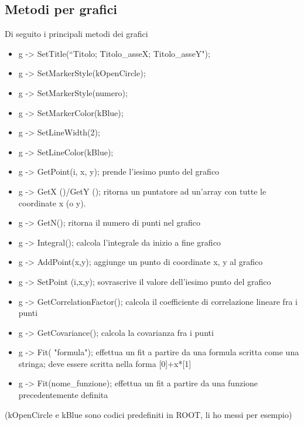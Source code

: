 \documentclass[10pt,a4paper]{article}
\begin{document}
\subsection{Metodi per grafici}
Di seguito i principali metodi dei grafici
\begin{itemize}
	\item g -> SetTitle(“Titolo; Titolo\_asseX; Titolo\_asseY");
	\item g -> SetMarkerStyle(kOpenCircle);
	\item g -> SetMarkerStyle(numero);
	\item g -> SetMarkerColor(kBlue);
	\item g -> SetLineWidth(2);
	\item g -> SetLineColor(kBlue);
	\item g -> GetPoint(i, x, y);
	prende l’iesimo punto del grafico
	\item g -> GetX ()/GetY ();
	ritorna un puntatore ad un'array con tutte le coordinate x (o y). 
	\item g -> GetN();
	ritorna il numero di punti nel grafico
	\item g -> Integral();
	calcola l'integrale da inizio a fine grafico
	\item g -> AddPoint(x,y);
	aggiunge un punto di coordinate x, y al grafico
	\item g -> SetPoint (i,x,y);
	sovrascrive il valore dell'iesimo punto del grafico
	\item g -> GetCorrelationFactor();
	calcola il coefficiente di correlazione lineare fra i punti
	\item g -> GetCovariance();
	calcola la covarianza fra i punti
	\item g -> Fit( "formula");
	effettua un fit a partire da una formula scritta come una stringa; deve essere scritta nella forma [0]+x*[1]
	\item g -> Fit(nome\_funzione);
	effettua un fit a partire da una funzione precedentemente definita
\end{itemize}
(kOpenCircle e kBlue sono codici predefiniti in ROOT, li ho messi per esempio)
\end{document}
